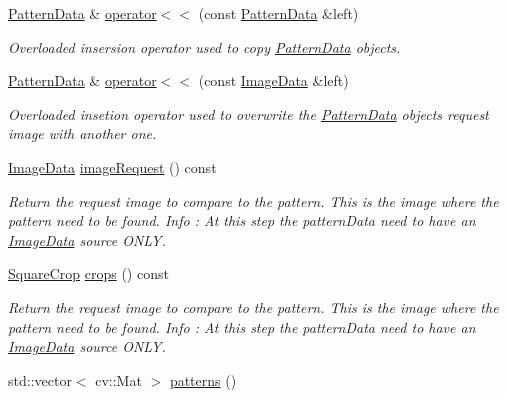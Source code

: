 \begin{DoxyCompactItemize}
\hyperlink{classfilter_1_1data_1_1_pattern_data}{Pattern\+Data} \& \hyperlink{classfilter_1_1data_1_1_pattern_data_aa01d481a29ec5690914612fb0b39e997}{operator$<$$<$} (const \hyperlink{classfilter_1_1data_1_1_pattern_data}{Pattern\+Data} \&left)
\begin{DoxyCompactList}\small\item\em Overloaded insersion operator used to copy \hyperlink{classfilter_1_1data_1_1_pattern_data}{Pattern\+Data} objects. \end{DoxyCompactList}\item 
\hyperlink{classfilter_1_1data_1_1_pattern_data}{Pattern\+Data} \& \hyperlink{classfilter_1_1data_1_1_pattern_data_a51313490894a4f3a0b4568d4c8b2462d}{operator$<$$<$} (const \hyperlink{classfilter_1_1data_1_1_image_data}{Image\+Data} \&left)
\begin{DoxyCompactList}\small\item\em Overloaded insetion operator used to overwrite the \hyperlink{classfilter_1_1data_1_1_pattern_data}{Pattern\+Data} object\textquotesingle{}s request image with another one. \end{DoxyCompactList}\item 
\hyperlink{classfilter_1_1data_1_1_image_data}{Image\+Data} \hyperlink{classfilter_1_1data_1_1_pattern_data_aa7f53d24f4a732739d815b48694c629f}{image\+Request} () const
\begin{DoxyCompactList}\small\item\em Return the request image to compare to the pattern. This is the image where the pattern need to be found. Info \+: At this step the pattern\+Data need to have an \hyperlink{classfilter_1_1data_1_1_image_data}{Image\+Data} source O\+N\+LY. \end{DoxyCompactList}\item 
\hyperlink{classfilter_1_1data_1_1_square_crop}{Square\+Crop} \hyperlink{classfilter_1_1data_1_1_pattern_data_af4d2493ea93e969aa63851124457e3ea}{crops} () const
\begin{DoxyCompactList}\small\item\em Return the request image to compare to the pattern. This is the image where the pattern need to be found. Info \+: At this step the pattern\+Data need to have an \hyperlink{classfilter_1_1data_1_1_image_data}{Image\+Data} source O\+N\+LY. \end{DoxyCompactList}\item 
std\+::vector$<$ cv\+::\+Mat $>$ \hyperlink{classfilter_1_1data_1_1_pattern_data_ae955f8086b628629ca8f380fb2ab540f}{patterns} ()

\end{DoxyCompactItemize}
